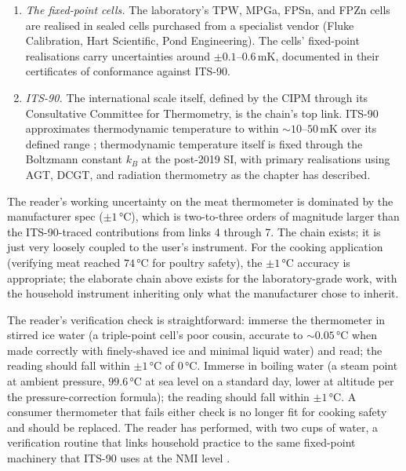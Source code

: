 \begin{enumerate}[leftmargin=*]
    chapter's temperature subsection), itself calibrated against
    ITS-90 fixed-point cells at the laboratory. The SPRT's
    calibration certificate carries an uncertainty around
    $\pm 2 \,\si{\milli\kelvin}$ over the working subrange.
  \item \emph{The fixed-point cells.} The laboratory's TPW, MPGa,
    FPSn, and FPZn cells are realised in sealed cells purchased
    from a specialist vendor (Fluke Calibration, Hart Scientific,
    Pond Engineering). The cells' fixed-point realisations carry
    uncertainties around $\pm 0.1$--$0.6 \,\si{\milli\kelvin}$,
    documented in their certificates of conformance against ITS-90.
  \item \emph{ITS-90.} The international scale itself, defined by
    the CIPM through its Consultative Committee for Thermometry,
    is the chain's top link. ITS-90 approximates thermodynamic
    temperature to within $\sim 10$--$50 \,\si{\milli\kelvin}$ over
    its defined range \cite{web:bipm-cct-its90};
    thermodynamic temperature itself is fixed through the Boltzmann
    constant $k_{B}$ at the post-2019 SI, with primary realisations
    using AGT, DCGT, and radiation thermometry as the chapter has
    described.
\end{enumerate}

The reader's working uncertainty on the meat thermometer is
dominated by the manufacturer spec ($\pm 1 \,\si{\degreeCelsius}$),
which is two-to-three orders of magnitude larger than the
ITS-90-traced contributions from links 4 through 7. The chain
exists; it is just very loosely coupled to the user's instrument.
For the cooking application (verifying meat reached
$74 \,\si{\degreeCelsius}$ for poultry safety), the $\pm 1 \,\si{
\degreeCelsius}$ accuracy is appropriate; the elaborate chain above
exists for the laboratory-grade work, with the household instrument
inheriting only what the manufacturer chose to inherit.

The reader's verification check is straightforward: immerse the
thermometer in stirred ice water (a triple-point cell's poor
cousin, accurate to $\sim 0.05 \,\si{\degreeCelsius}$ when made
correctly with finely-shaved ice and minimal liquid water) and
read; the reading should fall within $\pm 1 \,\si{\degreeCelsius}$
of $0 \,\si{\degreeCelsius}$. Immerse in boiling water (a steam
point at ambient pressure, $99.6 \,\si{\degreeCelsius}$ at sea
level on a standard day, lower at altitude per the
pressure-correction formula); the reading should fall within
$\pm 1 \,\si{\degreeCelsius}$. A consumer thermometer that fails
either check is no longer fit for cooking safety and should be
replaced. The reader has performed, with two cups of water, a
verification routine that links household practice to the same
fixed-point machinery that ITS-90 uses at the NMI level
\cite{text:ch03t3-quinn-1995}.

